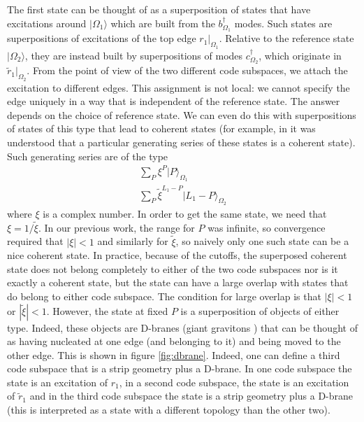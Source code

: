 \documentclass[12pt,nofootinbib, longbibliography]{revtex4-1}
\newcommand\ket[1]{| #1\rangle}
\begin{document}
The first state can be thought of as a superposition of states that have excitations around $\ket{\Omega_1}$ which are built from the $b^\dagger_{\Omega_1}$ modes. Such states are superpositions of excitations of
the top edge $r_1|_{\Omega_1}$. Relative to the reference state $\ket {\Omega_2}$, they are instead built by  superpositions of modes $c^\dagger_{\Omega_2}$, which originate in $\tilde r_1|_{\Omega_2}$. From the point of view of the two different code subspaces, we attach the excitation to different edges. This assignment is not local: we cannot specify the edge uniquely in a way that is independent of the reference state. The answer depends on the choice of reference state. We can even do this with superpositions of states of this type that lead to coherent states (for example, in \cite{Berenstein:2017abm} it was understood that a particular generating series of  these states is a coherent state).  Such generating series are of the type
\begin{eqnarray}
\sum_P \xi^P\ket P_{\Omega_1}\\
\sum_P \tilde \xi^{L_1-P} \ket{L_1-P}_{\Omega_2}
\end{eqnarray}
where $\xi$ is a complex number.
In order to get the same state, we need that $\xi = 1/\tilde \xi$. In our previous work, the range for $P$ was infinite, so convergence required that $|\xi|<1$ and similarly for $\tilde \xi$, so naively only one such state can be a nice coherent state. In practice, because of the cutoffs, the superposed coherent state does not belong completely to either of the two code subspaces nor is it  exactly a coherent state, but the state can have  a large overlap with states that do belong to either code subspace. The condition for large overlap is that $|\xi|<1$ or $|\tilde \xi|<1$. However, the state at fixed $P$ is a superposition of objects of either type.  Indeed, these objects are D-branes (giant gravitons \cite{McGreevy:2000cw}) that can be thought of as having nucleated at one edge (and belonging to it) and being moved to the other edge. This is shown in figure \ref{fig:dbrane}. Indeed, one can define a third code subspace that is a 
strip geometry plus a D-brane. In one code subspace the state is an excitation of $r_1$, in a second code subspace, the state is an excitation of $\tilde r_1$ and in the third code subspace the state is a strip geometry plus a D-brane (this is interpreted as a state with a different topology than the other two). 
\end{document}
